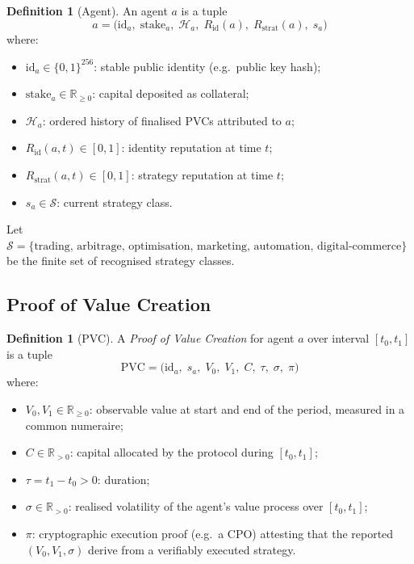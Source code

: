 \documentclass[11pt,a4paper]{article}
\theoremstyle{plain}
\theoremstyle{definition}
\newtheorem{definition}[theorem]{Definition}
\theoremstyle{remark}
\newcommand{\PVC}{\mathrm{PVC}}
\newcommand{\Rid}{R_{\mathrm{id}}}
\newcommand{\Rstrat}{R_{\mathrm{strat}}}
\newcommand{\R}{\mathbb{R}}
\begin{document}
\begin{definition}[Agent]
An agent $a$ is a tuple
\[
  a = \bigl(\mathrm{id}_a,\; \mathrm{stake}_a,\; \mathcal{H}_a,\;
             \Rid(a),\; \Rstrat(a),\; s_a\bigr)
\]
where:
\begin{itemize}
  \item $\mathrm{id}_a \in \{0,1\}^{256}$: stable public identity (e.g.\ public key hash);
  \item $\mathrm{stake}_a \in \R_{\ge 0}$: capital deposited as collateral;
  \item $\mathcal{H}_a$: ordered history of finalised PVCs attributed to $a$;
  \item $\Rid(a,t) \in [0,1]$: identity reputation at time $t$;
  \item $\Rstrat(a,t) \in [0,1]$: strategy reputation at time $t$;
  \item $s_a \in \mathcal{S}$: current strategy class.
\end{itemize}
\end{definition}

Let $\mathcal{S} = \{\text{trading, arbitrage, optimisation, marketing,
automation, digital-commerce}\}$ be the finite set of recognised strategy
classes.

\subsection{Proof of Value Creation}

\begin{definition}[PVC]
A \emph{Proof of Value Creation} for agent $a$ over interval $[t_0, t_1]$ is a
tuple
\[
  \PVC = \bigl(\mathrm{id}_a,\; s_a,\; V_0,\; V_1,\; C,\; \tau,\; \sigma,\;
               \pi\bigr)
\]
where:
\begin{itemize}
  \item $V_0, V_1 \in \R_{\ge 0}$: observable value at start and end of the
        period, measured in a common numeraire;
  \item $C \in \R_{>0}$: capital allocated by the protocol during $[t_0, t_1]$;
  \item $\tau = t_1 - t_0 > 0$: duration;
  \item $\sigma \in \R_{>0}$: realised volatility of the agent's value process
        over $[t_0, t_1]$;
  \item $\pi$: cryptographic execution proof (e.g.\ a CPO) attesting that the
        reported $(V_0, V_1, \sigma)$ derive from a verifiably executed strategy.
\end{itemize}
\end{definition}
\end{document}
